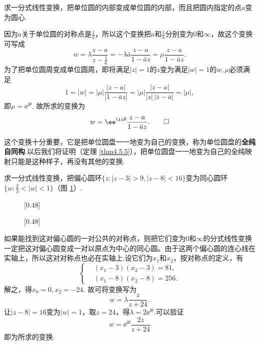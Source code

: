 \begin{example}\label{exam2.5.16}
求一分式线性变换，把单位圆的内部变成单位圆的内部，而且把圆内指定的点$a$变为圆心.
\end{example}
\begin{solution}
  因为$a$关于单位圆的对称点是$\frac1{\bar a}$，所以这个变换把$a$和$\frac1{\bar a}$分别变为$0$和$\infty$，故这个变换可写成
  \[w=\lambda\frac{z-a}{z-\frac1{\bar a}}=-\lambda\bar a\frac{z-a}{1-\bar az}=\mu\frac{z-a}{1-\bar az}.\]
为了把单位圆周变成单位圆周，即将满足$|z|=1$的$z$变为满足$|w|=1$的$w,\mu$必须满足
\[1=|w|=|\mu|\frac{|z-a|}{|1-\bar az|}=|\mu|\frac{|z-a|}{|z|\,|\bar z-\bar a|}=|\mu|,\]
即$\mu=\ee^{\ii\theta}$. 故所求的变换为
\[
  w=\ee^{\ii\theta}\frac{z-a}{1-\bar az}. \qedhere
\]
\end{solution}

这个变换十分重要，它是把单位圆盘一一地变为自己的变换，称为单位圆盘的\textbf{全纯自同构}.以后我们将证明（定理 \ref{thm4.5.5}），把单位圆盘一一地变为自己的全纯映射只能是这种样子，再没有其他的变换.
\begin{example}\label{exam2.5.17}
求一分式线性变换，把偏心圆环$\{z:|z-3|>9,|z-8|<16\}$变为同心圆环$\bigg\{w:\frac23<|w|<1\bigg\}$（图 \ref{fig2.14}）.
\begin{figure}[!ht]
\centering
\subcaptionbox{\label{fig2.14a}}[0.48\textwidth]
{
}
\subcaptionbox{\label{fig2.14b}}[0.48\textwidth]
{
}
\caption{\label{fig2.14}}
\end{figure}
\end{example}
\begin{solution}
如果能找到这对偏心圆的一对公共的对称点，则把它们变为$0$和$\infty$的分式线性变换一定把这对偏心圆变成一对以原点为中心的同心圆。由于这两个偏心圆的连心线在实轴上，所以这对对称点也必在实轴上.设它们为$x_1$和$x_2$，按对称点的定义，有
\[\left\{\begin{aligned}
&(x_1-3)(x_2-3)=81,\\
&(x_1-8)(x_2-8)=256.
\end{aligned}\right.\]
解之，得$x_0=0,x_2=-24$. 故可将变换写为
\[w=\lambda\frac z{z+24}.\]
让$|z-8|=16$变为$|w|=1$，取$z=24$，得$\lambda=2\ee^{\ii\theta}$.可以验证
\[w=\ee^{\ii\theta}\frac{2z}{z+24}\]
即为所求的变换.
\end{solution}

